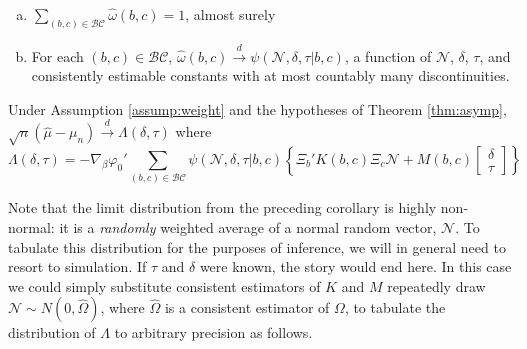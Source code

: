 \begin{assump}\mbox{}
	\begin{enumerate}[(a)] 
		\item $\sum_{(b,c) \in \mathcal{BC}} \widehat{\omega}(b,c) = 1$, almost surely
    \item For each $(b,c) \in \mathcal{BC}$, $\widehat{\omega}(b,c) \overset{d}{\rightarrow} \psi(\mathscr{N}, \delta, \tau|b,c)$,  a function of $\mathscr{N}$, $\delta$, $\tau$, and consistently estimable constants with at most countably many discontinuities.
	\end{enumerate}
\label{assump:weight}
\end{assump}

\begin{cor}
  Under Assumption \ref{assump:weight} and the hypotheses of Theorem \ref{thm:asymp},  
	$\sqrt{n}\left(\widehat{\mu} - \mu_n\right) \overset{d}{\rightarrow} \Lambda(\delta,\tau)$
where
	\begin{equation}
		\Lambda(\delta,\tau) = -\nabla_\beta\varphi_0' \sum_{(b,c) \in \mathcal{BC}} \psi(\mathscr{N},\delta, \tau|b,c) \left\{\Xi_b' K(b,c) \Xi_c \mathscr{N} + M(b,c)  \left[\begin{array}{c}\delta \\ \tau \end{array} \right]\right\}
	\end{equation}
\end{cor}
Note that the limit distribution from the preceding corollary is highly non-normal: it is a \emph{randomly} weighted average of a normal random vector, $\mathscr{N}$.
To tabulate this distribution for the purposes of inference, we will in general need to resort to simulation.
If $\tau$ and $\delta$ were known, the story would end here.
In this case we could simply substitute consistent estimators of $K$ and $M$ repeatedly draw $\mathscr{N} \sim N(0, \widehat{\Omega})$, where $\widehat{\Omega}$ is a consistent estimator of $\Omega$, to tabulate the distribution of $\Lambda$ to arbitrary precision as follows.

